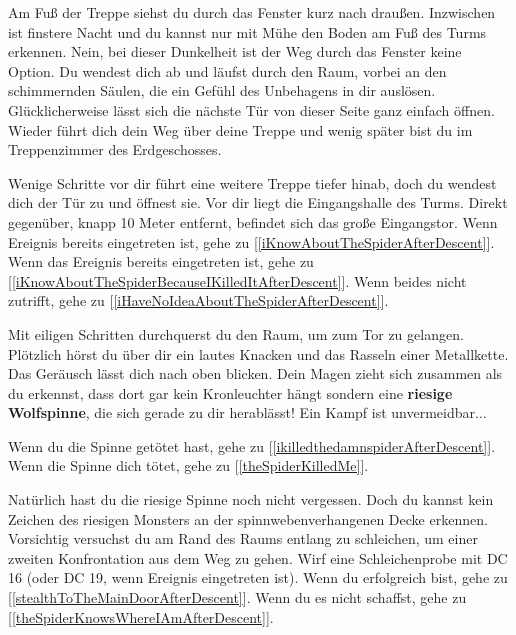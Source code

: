 Am Fuß der Treppe siehst du durch das Fenster kurz nach draußen. Inzwischen ist finstere Nacht und du kannst nur mit Mühe den Boden am Fuß des Turms erkennen. Nein, bei dieser Dunkelheit ist der Weg durch das Fenster keine Option. Du wendest dich ab und läufst durch den Raum, vorbei an den schimmernden Säulen, die ein Gefühl des Unbehagens in dir auslösen. Glücklicherweise lässt sich die nächste Tür von dieser Seite ganz einfach öffnen. Wieder führt dich dein Weg über deine Treppe und wenig später bist du im Treppenzimmer des Erdgeschosses.

Wenige Schritte vor dir führt eine weitere Treppe tiefer hinab, doch du wendest dich der Tür zu und öffnest sie. Vor dir liegt die Eingangshalle des Turms. Direkt gegenüber, knapp 10 Meter entfernt, befindet sich das große Eingangstor. Wenn Ereignis  bereits eingetreten ist, gehe zu [\ref{iKnowAboutTheSpiderAfterDescent}]. Wenn das Ereignis  bereits eingetreten ist, gehe zu [\ref{iKnowAboutTheSpiderBecauseIKilledItAfterDescent}].
Wenn beides nicht zutrifft, gehe zu [\ref{iHaveNoIdeaAboutTheSpiderAfterDescent}].


Mit eiligen Schritten durchquerst du den Raum, um zum Tor zu gelangen. Plötzlich hörst du über dir ein lautes Knacken und das Rasseln einer Metallkette.
Das Geräusch lässt dich nach oben blicken. Dein Magen zieht sich zusammen als du erkennst, dass dort gar kein Kronleuchter hängt sondern eine \textbf{riesige Wolfspinne}, die sich gerade zu dir herablässt! Ein Kampf ist unvermeidbar...


Wenn du die Spinne getötet hast, gehe zu [\ref{ikilledthedamnspiderAfterDescent}].
Wenn die Spinne dich tötet, gehe zu [\ref{theSpiderKilledMe}].


Natürlich hast du die riesige Spinne noch nicht vergessen. Doch du kannst kein Zeichen des riesigen Monsters an der spinnwebenverhangenen Decke erkennen. Vorsichtig versuchst du am Rand des Raums entlang zu schleichen, um einer zweiten Konfrontation aus dem Weg zu gehen. Wirf eine Schleichenprobe mit DC 16 (oder DC 19, wenn Ereignis  eingetreten ist). Wenn du erfolgreich bist, gehe zu [\ref{stealthToTheMainDoorAfterDescent}].
Wenn du es nicht schaffst, gehe zu [\ref{theSpiderKnowsWhereIAmAfterDescent}].

